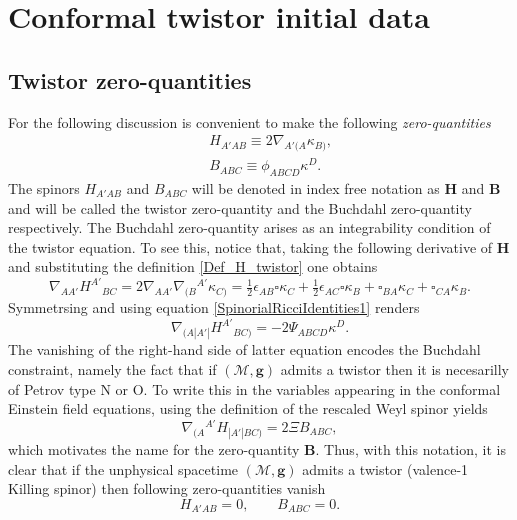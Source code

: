\documentclass[10pt,a4paper]{article}
\theoremstyle{plain}
\def\bmg{{\bm g}}
\def\bmB{{\bm B}}
\def\bmH{{\bm H}}
\begin{document}
{\color{blue}
  \section{Conformal twistor initial data}

\subsection{Twistor zero-quantities}
\label{Sec:TwistorZeroQuantities}

For the following discussion is convenient to make the following
\emph{zero-quantities}
\begin{subequations}
  \begin{eqnarray}
   && H_{A'AB} \equiv 2
    \nabla_{A'(A}\kappa_{B)},\label{Def_H_twistor}\\ && B_{ABC}
    \equiv \phi_{ABCD}\kappa^D.\label{Def_B_twistor}
    \end{eqnarray}
\end{subequations}
The spinors $H_{A'AB}$ and $B_{ABC}$ will be denoted in index free
notation as $\bmH$ and $\bmB$ and will be called the twistor
zero-quantity and the Buchdahl zero-quantity respectively.  The
Buchdahl zero-quantity arises as an integrability condition of the
twistor equation.  To see this, notice that, taking the following
derivative of $\bmH$ and substituting the definition
\eqref{Def_H_twistor} one obtains
  \begin{equation}\label{curl_H_twistor}
  \nabla_{AA'}H^{A'}{}_{BC}= 2 \nabla_{AA'}\nabla_{(B}{}^{A'}\kappa
  _{C)} = \tfrac{1}{2} \epsilon _{AB} \square \kappa _{C}  +
  \tfrac{1}{2}  \epsilon _{AC} \square \kappa _{B} +
  \square_{BA}\kappa _{C} + \square_{CA}\kappa _{B}.
  \end{equation}
  Symmetrsing and using equation \eqref{SpinorialRicciIdentities1} renders
  \[
  \nabla_{(A|A'|}H^{A'}{}_{BC)}= - 2\Psi_{ABCD}\kappa^D.
  \]
  The vanishing of the right-hand side of latter equation encodes the
  Buchdahl constraint, namely the fact that if $(\mathcal{M},\bmg)$
  admits a twistor then it is necesarilly of Petrov type N or O. To write this in the variables appearing in the  conformal Einstein field equations, using the definition of the
  rescaled Weyl spinor yields
  \begin{equation}\label{Curl_H_sym_toB_twistor}
  \nabla_{(A}{}^{A'}H_{|A'|BC)} = 2\Xi B_{ABC},
  \end{equation}
  which motivates the name for the zero-quantity $\bmB$.
  Thus, with this notation, it is clear that if the unphysical spacetime
  $(\mathcal{M},\bmg)$ admits a twistor (valence-1 Killing spinor) then following
  zero-quantities vanish
  \begin{equation}
H_{A'AB}=0, \qquad B_{ABC}=0.
  \end{equation}
}
\end{document}
